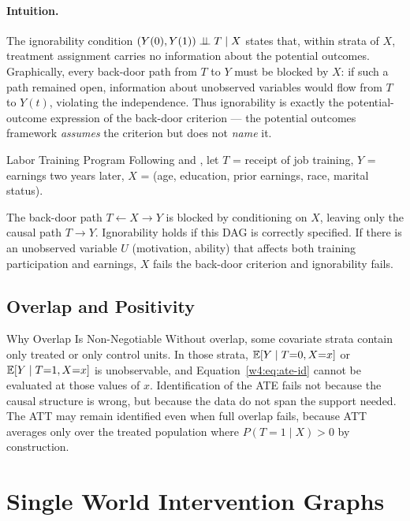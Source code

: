 \documentclass[master.tex]{subfiles}
\begin{document}
\paragraph{Intuition.}
The ignorability condition $(Y(0),Y(1)) \perp\!\!\!\perp T \mid X$ states that,
within strata of $X$, treatment assignment carries no information about
the potential outcomes.  Graphically, every back-door path from $T$ to $Y$
must be blocked by $X$: if such a path remained open, information about
unobserved variables would flow from $T$ to $Y(t)$, violating the
independence.  Thus ignorability is exactly the potential-outcome expression
of the back-door criterion --- the potential outcomes framework
\emph{assumes} the criterion but does not \emph{name} it.

\begin{example}{Labor Training Program}
\label{w4:ex:lalonde}
Following \citet{lalonde1986evaluating} and \citet{dehejia1999causal},
let $T$ = receipt of job training, $Y$ = earnings two years later,
$X$ = (age, education, prior earnings, race, marital status).

The back-door path $T \leftarrow X \to Y$ is blocked by conditioning on
$X$, leaving only the causal path $T \to Y$.  Ignorability holds if this
DAG is correctly specified.  If there is an unobserved variable $U$
(motivation, ability) that affects both training participation and earnings,
$X$ fails the back-door criterion and ignorability fails.
\end{example}

\subsection{Overlap and Positivity}

\begin{warn}{Why Overlap Is Non-Negotiable}
Without overlap, some covariate strata contain only treated or only control
units.  In those strata, $\mathbb{E}[Y \mid T{=}0, X{=}x]$ or
$\mathbb{E}[Y \mid T{=}1, X{=}x]$ is unobservable, and
Equation~\eqref{w4:eq:ate-id} cannot be evaluated at those values of $x$.
Identification of the ATE fails not because the causal structure is wrong,
but because the data do not span the support needed.  The ATT may remain
identified even when full overlap fails, because ATT averages only over the
treated population where $P(T{=}1 \mid X) > 0$ by construction.
\end{warn}

\section{Single World Intervention Graphs}
\label{w4:sec:swig}
\end{document}
